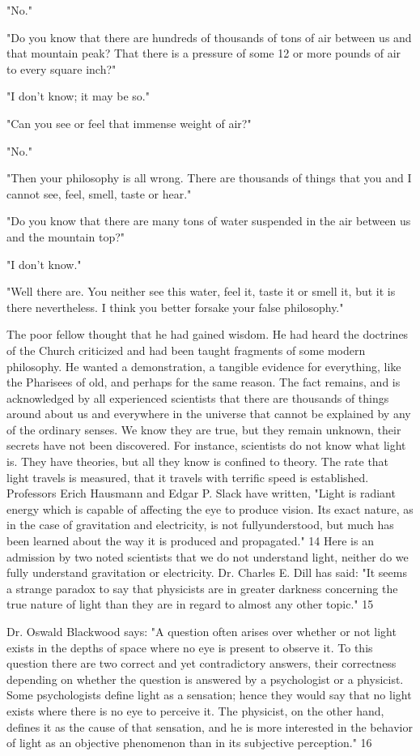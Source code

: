 "No."

"Do you know that there are hundreds of thousands of tons of air between us and that
mountain peak? That there is a pressure of some 12 or more pounds of air to every square
inch?"

"I don't know; it may be so."

"Can you see or feel that immense weight of air?"

"No."

"Then your philosophy is all wrong. There are thousands of things that you and I cannot see,
feel, smell, taste or hear."

"Do you know that there are many tons of water suspended in the air between us and the
mountain top?"

"I don't know."

"Well there are. You neither see this water, feel it, taste it or smell it, but it is there
nevertheless. I think you better forsake your false philosophy."

The poor fellow thought that he had gained wisdom. He had heard the doctrines of the
Church criticized and had been taught fragments of some modern philosophy. He wanted a
demonstration, a tangible evidence for everything, like the Pharisees of old, and perhaps for
the same reason. The fact remains, and is acknowledged by all experienced scientists that
there are thousands of things around about us and everywhere in the universe that cannot be
explained by any of the ordinary senses. We know they are true, but they remain unknown,
their secrets have not been discovered. For instance, scientists do not know what light is.
They have theories, but all they know is confined to theory. The rate that light travels is
measured, that it travels with terrific speed is established. Professors Erich Hausmann and
Edgar P. Slack have written, "Light is radiant energy which is capable of affecting the eye to
produce vision. Its exact nature, as in the case of gravitation and electricity, is not fullyunderstood, but much has been learned about the way it is produced and propagated." 14
Here is an admission by two noted scientists that we do not understand light, neither do we
fully understand gravitation or electricity. Dr. Charles E. Dill has said: "It seems a strange
paradox to say that physicists are in greater darkness concerning the true nature of light than
they are in regard to almost any other topic." 15

Dr. Oswald Blackwood says: "A question often arises over whether or not light exists in the
depths of space where no eye is present to observe it. To this question there are two correct
and yet contradictory answers, their correctness depending on whether the question is
answered by a psychologist or a physicist. Some psychologists define light as a sensation;
hence they would say that no light exists where there is no eye to perceive it. The physicist,
on the other hand, defines it as the cause of that sensation, and he is more interested in the
behavior of light as an objective phenomenon than in its subjective perception." 16

